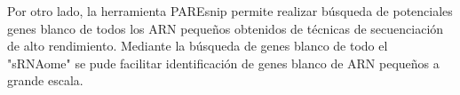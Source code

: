 Por otro lado, la herramienta PAREsnip permite realizar búsqueda de potenciales genes blanco de todos los ARN pequeños obtenidos de técnicas de secuenciación de alto rendimiento.
Mediante la búsqueda de genes blanco de todo el "sRNAome" se pude facilitar identificación de genes blanco de ARN pequeños a grande escala.

